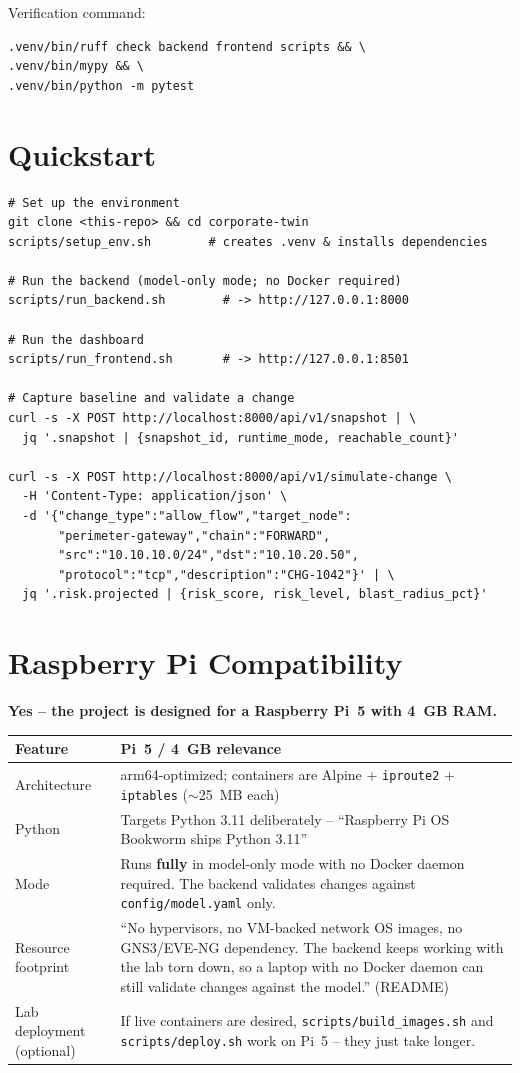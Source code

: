 \documentclass[11pt,a4paper]{article}
\begin{document}
Verification command:
\begin{verbatim}
.venv/bin/ruff check backend frontend scripts && \
.venv/bin/mypy && \
.venv/bin/python -m pytest
\end{verbatim}

\section{Quickstart}
\begin{verbatim}
# Set up the environment
git clone <this-repo> && cd corporate-twin
scripts/setup_env.sh        # creates .venv & installs dependencies

# Run the backend (model-only mode; no Docker required)
scripts/run_backend.sh        # -> http://127.0.0.1:8000

# Run the dashboard
scripts/run_frontend.sh       # -> http://127.0.0.1:8501

# Capture baseline and validate a change
curl -s -X POST http://localhost:8000/api/v1/snapshot | \
  jq '.snapshot | {snapshot_id, runtime_mode, reachable_count}'

curl -s -X POST http://localhost:8000/api/v1/simulate-change \
  -H 'Content-Type: application/json' \
  -d '{"change_type":"allow_flow","target_node":
       "perimeter-gateway","chain":"FORWARD",
       "src":"10.10.10.0/24","dst":"10.10.20.50",
       "protocol":"tcp","description":"CHG-1042"}' | \
  jq '.risk.projected | {risk_score, risk_level, blast_radius_pct}'
\end{verbatim}

\section{Raspberry Pi Compatibility}
\textbf{Yes -- the project is designed for a Raspberry Pi~5 with 4~GB RAM.}

\begin{tabularx}{\linewidth}{>{\hsize=0.6\hsize}X >{\hsize=1.4\hsize}X}
  \toprule
  \textbf{Feature} & \textbf{Pi~5 / 4~GB relevance} \\
  \midrule
  Architecture & arm64-optimized; containers are Alpine + \texttt{iproute2} + \texttt{iptables} ($\sim$25~MB each) \\
  Python & Targets Python 3.11 deliberately -- ``Raspberry Pi OS Bookworm ships Python 3.11'' \\
  Mode & Runs \textbf{fully} in model-only mode with no Docker daemon required. The backend validates changes against \texttt{config/model.yaml} only. \\
  Resource footprint & ``No hypervisors, no VM-backed network OS images, no GNS3/EVE-NG dependency. The backend keeps working with the lab torn down, so a laptop with no Docker daemon can still validate changes against the model.'' (README) \\
  Lab deployment (optional) & If live containers are desired, \texttt{scripts/build\_images.sh} and \texttt{scripts/deploy.sh} work on Pi~5 -- they just take longer. \\
  \bottomrule
\end{tabularx}
\end{document}
